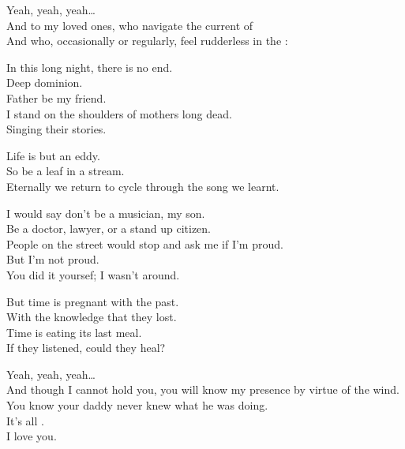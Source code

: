 



Yeah, yeah, yeah… \\
And to my loved ones, who navigate the current of  \\
And who, occasionally or regularly, feel rudderless in the : \\


In this long night, there is no end. \\
Deep dominion. \\
Father be my friend. \\
I stand on the shoulders of mothers long dead. \\
Singing their stories. \\


Life is but an eddy. \\
So be a leaf in a stream. \\
Eternally we return to cycle through the song we learnt. \\


I would say don't be a musician, my son. \\
Be a doctor, lawyer, or a stand up citizen. \\
People on the street would stop and ask me if I'm proud. \\
But I'm not proud. \\
You did it yoursef; I wasn't around. \\


But time is pregnant with the past. \\
With the knowledge that they lost. \\
Time is eating its last meal. \\
If they listened, could they heal? \\


Yeah, yeah, yeah… \\
And though I cannot hold you, you will know my presence by virtue of the wind. \\
You know your daddy never knew what he was doing. \\
It's all . \\
I love you. \\

